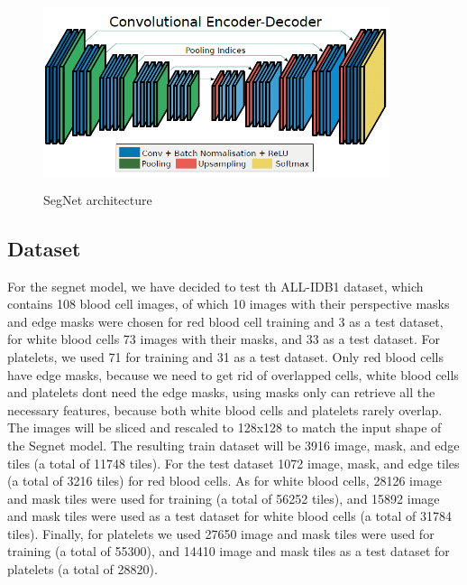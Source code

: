 \begin{figure}[H]
\centering
  \vspace{-0.1in}
    \centerline{\includegraphics[width = 4in, height = 2.2in]{../images/segnet.png}}
    \caption{SegNet architecture}
\end{figure}

\subsection{Dataset}
For the segnet model, we have decided to test th ALL-IDB1 dataset, which contains 108 blood cell images, of which 10 images with their perspective masks and edge masks were chosen for red blood cell training and 3 as a test dataset, for white blood cells 73 images with their masks, and 33 as a test dataset.
For platelets, we used 71 for training and 31 as a test dataset.
Only red blood cells have edge masks, because we need to get rid of overlapped cells, white blood cells and platelets dont need the edge masks, using masks only can retrieve all the necessary features, because both white blood cells and platelets rarely overlap.
The images will be sliced and rescaled to 128x128 to match the input shape of the Segnet model.
The resulting train dataset will be 3916 image, mask, and edge tiles (a total of 11748 tiles).
For the test dataset 1072 image, mask, and edge tiles (a total of 3216 tiles) for red blood cells.
As for white blood cells, 28126 image and mask tiles were used for training (a total of 56252 tiles), and 15892 image and mask tiles were used as a test dataset for white blood cells (a total of 31784 tiles).
Finally, for platelets we used 27650 image and mask tiles were used for training (a total of 55300), and 14410 image and mask tiles as a test dataset for platelets (a total of 28820).

\vspace{0.1in}




